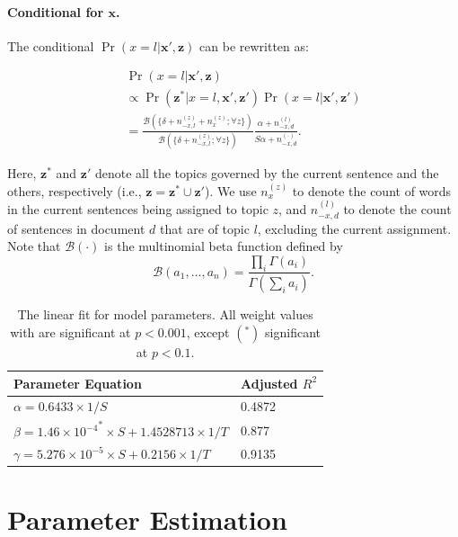 \paragraph{Conditional for $\mathbf{x}$.}  The conditional $\Pr(x =
l|\mathbf{x}',\mathbf{z})$ can be rewritten as: 

\begin{small}
\begin{eqnarray*}
  && \Pr(x = l|\mathbf{x}',\mathbf{z}) \nonumber\\
  && \propto \Pr(\mathbf{z}^*|x = l, \mathbf{x}', \mathbf{z}') \Pr(x = l |\mathbf{x}',\mathbf{z}') \\
  && = \frac{\mathcal{B}(\{\delta + n_{-x,l}^{(z)} + n_x^{(z)}; \forall z\})}{\mathcal{B}(\{\delta + n_{-x,l}^{(z)}; \forall z\})}
  \frac{\alpha + n_{-x,d}^{(l)}}{S \alpha + n_{-x,d}^{(\cdot)}}.
\end{eqnarray*}
\end{small}

Here, $\mathbf{z}^*$ and $\mathbf{z}'$ denote all the topics governed by the
current sentence and the others, respectively (i.e., $\mathbf{z} = \mathbf{z}^*
\cup \mathbf{z}'$).  We use $n_x^{(z)}$ to denote the count of words in the
current sentences being assigned to topic $z$, and $n_{-x,d}^{(l)}$ to denote
the count of sentences in document $d$ that are of topic $l$, excluding the
current assignment.  Note that $\mathcal{B}(\cdot)$ is the multinomial beta
function defined by \[\mathcal{B}(a_1, \ldots, a_n) = \frac{\prod_i
\Gamma(a_i)}{\Gamma(\sum_i a_i)}. \]

\begin{table}[!ht]
  \centering
  \begin{tabular}{ll}
    Parameter Equation &  Adjusted $R^2$ \\
    \hline
    $\alpha = 0.6433 \times 1/S$ & 0.4872 \\
    $\beta = 1.46 \times {10^{-4}}^{*} \times S + 1.4528713 \times 1/T$ & 0.877 \\
    $\gamma = 5.276 \times {10^{-5}} \times S + 0.2156 \times 1/T $& 0.9135 
  \end{tabular}

  \caption{The linear fit for model parameters.  All weight values with are
  significant at $p < 0.001$, except $(^*)$
  significant at $p < 0.1$.}\label{t:model-parameters} \end{table}

\section{Parameter Estimation} \label{s:parameter-estimation} 

